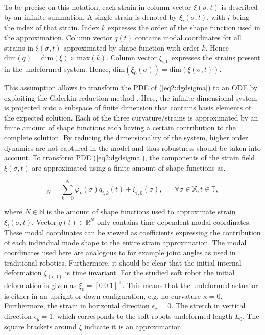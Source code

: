 To be precise on this notation, each strain in column vector $\xi(\sigma,t)$ is described by an infinite summation. A single strain is denoted by $\xi_i(\sigma,t)$, with $i$ being the index of that strain. Index $k$ expresses the order of the shape function used in the approximation. Column vector $q(t)$ contains modal coordinates for all strains in $\xi(\sigma,t)$ approximated by shape function with order $k$. Hence $\text{dim}(q) = \text{dim}(\xi) \times \text{max}(k)$. Column vector $\xi_{i,0}$ expresses the strains present in the undeformed system. Hence, $\text{dim}(\xi_0(\sigma)) = \text{dim}(\xi(\sigma,t))$.

This assumption allows to transform the PDE of (\ref{eq2:dgdsigma}) to an ODE by exploiting the Galerkin reduction method \cite{Galerkin}. Here, the infinite dimensional system is projected onto a subspace of finite dimension that contains basis elements of the expected solution. Each of the three curvature/strains is approximated by an finite amount of shape functions each having a certain contribution to the complete solution. By reducing the dimensionality of the system, higher order dynamics are not captured in the model and thus robustness should be taken into account. To transform PDE (\ref{eq2:dgdsigma}), the components of the strain field $\xi(\sigma,t)$ are approximated using a finite amount of shape functions as,

\begin{equation}
    [\xi_i(\sigma,t)]_N = \sum_{k=0}^N \varphi_k(\sigma)q_{i,k}(t) + \xi_{i,0}(\sigma), \hspace{20pt} \forall \sigma \in \mathbb{X}, t \in \mathbb{T},
    \label{eq2:strainapprox}
\end{equation}

where $N \in \mathbb{N}$ is the amount of shape functions used to approximate strain $\xi_i(\sigma,t)$. Vector $q(t) \in \mathbb{R}^N$ only contains time dependent modal coordinates. These modal coordinates can be viewed as coefficients expressing the contribution of each individual mode shape to the entire strain approximation. The modal coordinates used here are analogous to for example joint angles as used in traditional robotics. Furthermore, it should be clear that the initial internal deformation $\xi_{(i,0)}$ is time invariant. For the studied soft robot the initial deformation is given as $\xi_0 = [0 \hspace{3pt} 0 \hspace{3pt} 1]^\top$. This means that the undeformed actuator is either in an upright or down configuration, e.g. no curvature $\kappa = 0$. Furthermore, the strain in horizontal direction $\epsilon_x = 0$. The stretch in vertical direction $\epsilon_y = 1$, which corresponds to the soft robots undeformed length $L_0$. The square brackets around $\xi$ indicate it is an approximation. 

